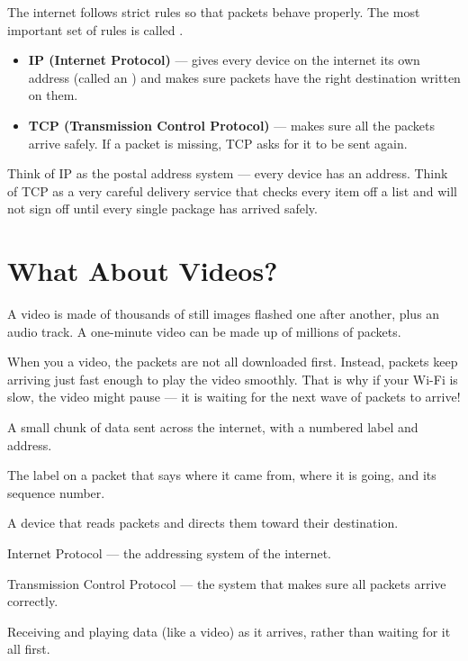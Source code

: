 The internet follows strict rules so that packets behave properly.
The most important set of rules is called .

\begin{itemize}
  \item \textbf{IP (Internet Protocol)} — gives every device on the internet its own address
        (called an ) and makes sure packets have the right destination written on them.
  \item \textbf{TCP (Transmission Control Protocol)} — makes sure all the packets arrive safely.
        If a packet is missing, TCP asks for it to be sent again.
\end{itemize}

\begin{picturethis}
  Think of IP as the postal address system — every device has an address.
  Think of TCP as a very careful delivery service that checks every item off a list
  and will not sign off until every single package has arrived safely.
\end{picturethis}

\sectionrule

\section*{What About Videos?}

A video is made of thousands of still images flashed one after another,
plus an audio track.
A one-minute video can be made up of millions of packets.

When you  a video, the packets are not all downloaded first.
Instead, packets keep arriving just fast enough to play the video smoothly.
That is why if your Wi-Fi is slow, the video might pause —
it is waiting for the next wave of packets to arrive!

\sectionrule

\begin{newwords}
  \begin{description}[labelwidth=3.2cm, leftmargin=3.4cm]
    \item[\term{Packet}]   A small chunk of data sent across the internet, with a numbered label and address.
    \item[\term{Header}]   The label on a packet that says where it came from, where it is going, and its sequence number.
    \item[\term{Router}]   A device that reads packets and directs them toward their destination.
    \item[\term{IP}]       Internet Protocol — the addressing system of the internet.
    \item[\term{TCP}]      Transmission Control Protocol — the system that makes sure all packets arrive correctly.
    \item[\term{Streaming}] Receiving and playing data (like a video) as it arrives, rather than waiting for it all first.
  \end{description}
\end{newwords}


